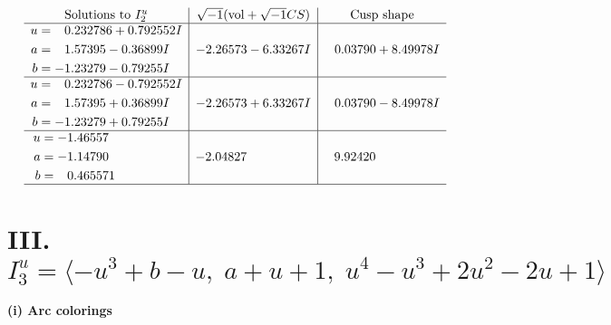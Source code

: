 \documentclass[1p]{elsarticle_modified}
\theoremstyle{definition}
\newcommand{\I}{\sqrt{-1}}
\begin{document}
$$\begin{array}{c|c|c}  
\text{Solutions to }I^u_{2}& \I (\text{vol} + \sqrt{-1}CS) & \text{Cusp shape}\\
 \hline 
\begin{aligned}
u &= \phantom{-}0.232786 + 0.792552 I \\
a &= \phantom{-}1.57395 - 0.36899 I \\
b &= -1.23279 - 0.79255 I\end{aligned}
 & -2.26573 - 6.33267 I & \phantom{-}0.03790 + 8.49978 I \\ \hline\begin{aligned}
u &= \phantom{-}0.232786 - 0.792552 I \\
a &= \phantom{-}1.57395 + 0.36899 I \\
b &= -1.23279 + 0.79255 I\end{aligned}
 & -2.26573 + 6.33267 I & \phantom{-}0.03790 - 8.49978 I \\ \hline\begin{aligned}
u &= -1.46557\phantom{ +0.000000I} \\
a &= -1.14790\phantom{ +0.000000I} \\
b &= \phantom{-}0.465571\phantom{ +0.000000I}\end{aligned}
 & -2.04827\phantom{ +0.000000I} & \phantom{-}9.92420\phantom{ +0.000000I}\\
 \hline 
 \end{array}$$\newpage\newpage\renewcommand{\arraystretch}{1}
\centering \section*{III. $I^u_{3}= \langle - u^3+b- u,\;a+u+1,\;u^4- u^3+2 u^2-2 u+1 \rangle$}
\flushleft \textbf{(i) Arc colorings}\\
\end{document}

